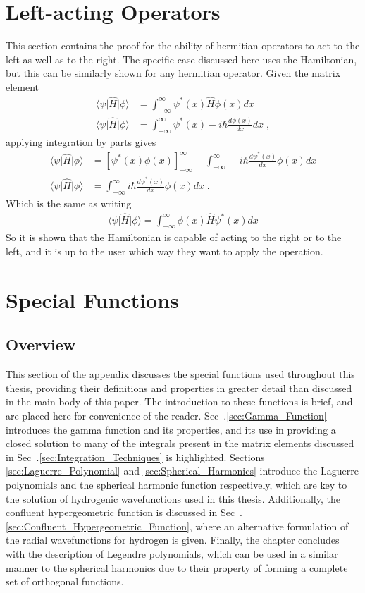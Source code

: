 \chapter{Left-acting Operators} \label{sec:Hermitian_Left}
    This section contains the proof for the ability of hermitian operators to act to the left as well as to the right. The specific case discussed here uses the Hamiltonian, but this can be similarly shown for any hermitian operator. Given the matrix element
    \begin{align}
        \langle \psi \vert \hat{H} \vert \phi \rangle &= \int^\infty_{-\infty} \psi^*(x) \hat{H} \phi(x) dx\\
        \langle \psi \vert \hat{H} \vert \phi \rangle &= \int^\infty_{-\infty} \psi^*(x) -i\hbar\frac{d \phi(x)}{dx} dx\;,
    \end{align}
    \noindent applying integration by parts gives 
    \begin{align}
        \langle \psi \vert \hat{H} \vert \phi \rangle &= \left[\psi^*(x) \phi(x) \right]^\infty_{-\infty} - \int_{-\infty}^\infty -i\hbar \frac{d\psi^*(x)}{dx} \phi(x) dx\\
        \langle \psi \vert \hat{H} \vert \phi \rangle &= \int_{-\infty}^\infty i\hbar \frac{d\psi^*(x)}{dx} \phi(x) dx\;.
    \end{align}
    \noindent Which is the same as writing
    \begin{align}
        \langle \psi \vert \hat{H} \vert \phi \rangle = \int^\infty_{-\infty} \phi(x) \hat{H} \psi^*(x) dx
    \end{align}
    \noindent So it is shown that the Hamiltonian is capable of acting to the right or to the left, and it is up to the user which way they want to apply the operation.
\chapter{Special Functions}
    \section{Overview}
        This section of the appendix discusses the special functions used throughout this thesis, providing their definitions and properties in greater detail than discussed in the main body of this paper. The introduction to these functions is brief, and are placed here for convenience of the reader. Sec~.\ref{sec:Gamma_Function} introduces the gamma function and its properties, and its use in providing a closed solution to many of the integrals present in the matrix elements discussed in Sec~.\ref{sec:Integration_Techniques} is highlighted. Sections \ref{sec:Laguerre_Polynomial} and \ref{sec:Spherical_Harmonics} introduce the Laguerre polynomials and the spherical harmonic function respectively, which are key to the solution of hydrogenic wavefunctions used in this thesis. Additionally, the confluent hypergeometric function is discussed in Sec~.\ref{sec:Confluent_Hypergeometric_Function}, where an alternative formulation of the radial wavefunctions for hydrogen is given. Finally, the chapter concludes with the description of Legendre polynomials, which can be used in a similar manner to the spherical harmonics due to their property of forming a complete set of orthogonal functions.
